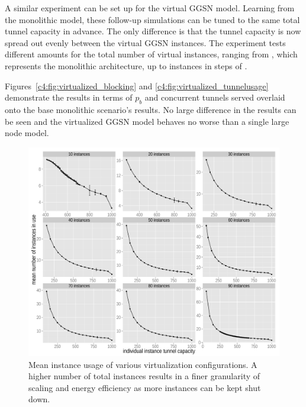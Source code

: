 A similar experiment can be set up for the virtual \gls{GGSN} model. Learning from the monolithic model, these follow-up simulations can be tuned to the same total tunnel capacity in advance. The only difference is that the tunnel capacity is now spread out evenly between the virtual \gls{GGSN} instances. The experiment tests different amounts for the total number of virtual instances, ranging from , which represents the monolithic architecture, up to  instances in steps of .

Figures~\ref{c4:fig:virtualized_blocking} and \ref{c4:fig:virtualized_tunnelusage} demonstrate the results in terms of $p_b$ and concurrent tunnels served overlaid onto the base monolithic scenario's results. No large difference in the results can be seen and the virtualized \gls{GGSN} model behaves no worse than a single large node model.

\begin{figure}[htb]
  \centering
  \includegraphics[width=1.0\textwidth]{images/R-virtualized-mean-instanceusage.pdf}
  \caption{Mean instance usage of various virtualization configurations. A higher number of total instances results in a finer granularity of scaling and energy efficiency as more instances can be kept shut down.}
 \label{c4:fig:res-instance-usage-mean}
\end{figure}


